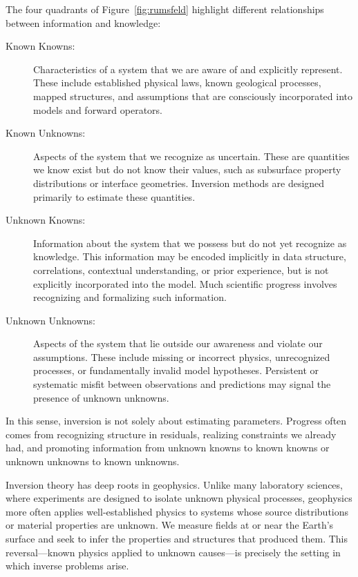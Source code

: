 The four quadrants of Figure~\ref{fig:rumsfeld} highlight different relationships between information and knowledge:
\begin{description}
    \item[Known Knowns:]
    Characteristics of a system that we are aware of and explicitly represent. These include established physical laws, known geological processes, mapped structures, and assumptions that are consciously incorporated into models and forward operators.

    \item[Known Unknowns:]
    Aspects of the system that we recognize as uncertain. These are quantities we know exist but do not know their values, such as subsurface property distributions or interface geometries. Inversion methods are designed primarily to estimate these quantities.

    \item[Unknown Knowns:]
    Information about the system that we possess but do not yet recognize as knowledge. This information may be encoded implicitly in data structure, correlations, contextual understanding, or prior experience, but is not explicitly incorporated into the model. Much scientific progress involves recognizing and formalizing such information.

    \item[Unknown Unknowns:]
    Aspects of the system that lie outside our awareness and violate our assumptions. These include missing or incorrect physics, unrecognized processes, or fundamentally invalid model hypotheses. Persistent or systematic misfit between observations and predictions may signal the presence of unknown unknowns.
\end{description}

In this sense, inversion is not solely about estimating parameters. Progress often comes from recognizing structure in residuals, realizing constraints we already had, and promoting information from unknown knowns to known knowns or unknown unknowns to known unknowns.

Inversion theory has deep roots in geophysics. Unlike many laboratory sciences, where experiments are designed to isolate unknown physical processes, geophysics more often applies well-established physics to systems whose source distributions or material properties are unknown. We measure fields at or near the Earth's surface and seek to infer the properties and structures that produced them. This reversal---known physics applied to unknown causes---is precisely the setting in which inverse problems arise.

